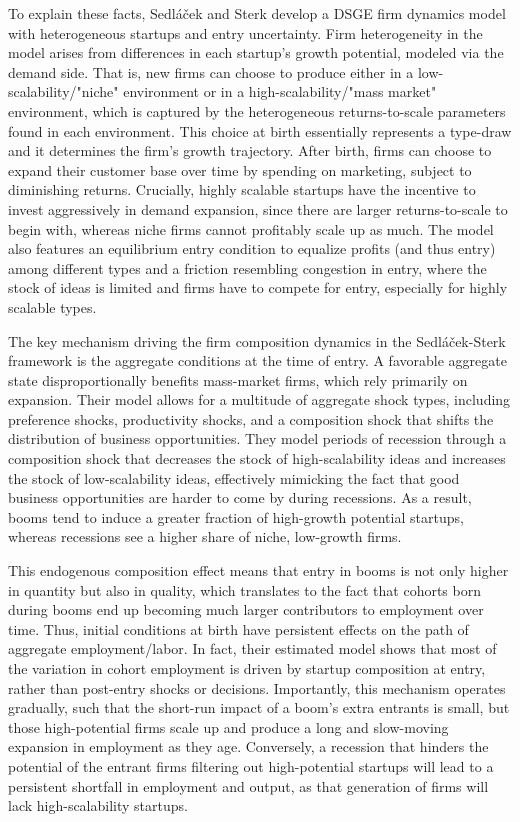 \documentclass[a4paper,12pt]{article} %
\numberwithin{equation}{section} %
\numberwithin{figure}{section}
\numberwithin{table}{section}
\begin{document}
To explain these facts, Sedláček and Sterk develop a DSGE firm dynamics model with heterogeneous startups and entry uncertainty. Firm heterogeneity in the model arises from differences in each startup's growth potential, modeled via the demand side. That is, new firms can choose to produce either in a low-scalability/"niche" environment or in a high-scalability/"mass market" environment, which is captured by the heterogeneous returns-to-scale parameters found in each environment. This choice at birth essentially represents a type-draw and it determines the firm's growth trajectory. After birth, firms can choose to expand their customer base over time by spending on marketing, subject to diminishing returns. Crucially, highly scalable startups have the incentive to invest aggressively in demand expansion, since there are larger returns-to-scale to begin with, whereas niche firms cannot profitably scale up as much. The model also features an equilibrium entry condition to equalize profits (and thus entry) among different types and a friction resembling congestion in entry, where the stock of ideas is limited and firms have to compete for entry, especially for highly scalable types.

The key mechanism driving the firm composition dynamics in the Sedláček-Sterk framework is the aggregate conditions at the time of entry. A favorable aggregate state disproportionally benefits mass-market firms, which rely primarily on expansion. Their model allows for a multitude of aggregate shock types, including preference shocks, productivity shocks, and a composition shock that shifts the distribution of business opportunities. They model periods of recession through a composition shock that decreases the stock of high-scalability ideas and increases the stock of low-scalability ideas, effectively mimicking the fact that good business opportunities are harder to come by during recessions. As a result, booms tend to induce a greater fraction of high-growth potential startups, whereas recessions see a higher share of niche, low-growth firms. 

This endogenous composition effect means that entry in booms is not only higher in quantity but also in quality, which translates to the fact that cohorts born during booms end up becoming much larger contributors to employment over time. Thus, initial conditions at birth have persistent effects on the path of aggregate employment/labor. In fact, their estimated model shows that most of the variation in cohort employment is driven by startup composition at entry, rather than post-entry shocks or decisions. Importantly, this mechanism operates gradually, such that the short-run impact of a boom's extra entrants is small, but those high-potential firms scale up and produce a long and slow-moving expansion in employment as they age. Conversely, a recession that hinders the potential of the entrant firms filtering out high-potential startups will lead to a persistent shortfall in employment and output, as that generation of firms will lack high-scalability startups.
\end{document}
